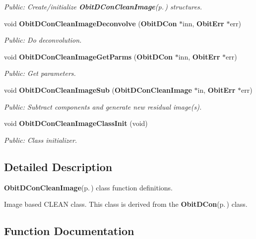 \begin{CompactItemize}
\begin{CompactList}\small\item\em Public: Create/initialize {\bf Obit\-DCon\-Clean\-Image}{\rm (p.\,\pageref{structObitDConCleanImage})} structures. \item\end{CompactList}\item 
void {\bf Obit\-DCon\-Clean\-Image\-Deconvolve} ({\bf Obit\-DCon} $\ast$inn, {\bf Obit\-Err} $\ast$err)
\begin{CompactList}\small\item\em Public: Do deconvolution. \item\end{CompactList}\item 
void {\bf Obit\-DCon\-Clean\-Image\-Get\-Parms} ({\bf Obit\-DCon} $\ast$inn, {\bf Obit\-Err} $\ast$err)
\begin{CompactList}\small\item\em Public: Get parameters. \item\end{CompactList}\item 
void {\bf Obit\-DCon\-Clean\-Image\-Sub} ({\bf Obit\-DCon\-Clean\-Image} $\ast$in, {\bf Obit\-Err} $\ast$err)
\begin{CompactList}\small\item\em Public: Subtract components and generate new residual image(s). \item\end{CompactList}\item 
void {\bf Obit\-DCon\-Clean\-Image\-Class\-Init} (void)
\begin{CompactList}\small\item\em Public: Class initializer. \item\end{CompactList}\end{CompactItemize}


\subsection{Detailed Description}
{\bf Obit\-DCon\-Clean\-Image}{\rm (p.\,\pageref{structObitDConCleanImage})} class function definitions. 

Image based CLEAN class. This class is derived from the {\bf Obit\-DCon}{\rm (p.\,\pageref{structObitDCon})} class.

\subsection{Function Documentation}
